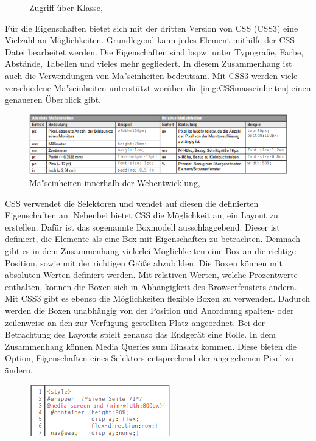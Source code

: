 \documentclass[a4paper,titlepage,halfparskip,12pt]{scrreprt}
\begin{document}
\begin{onehalfspacing}
\begin{figure}[h]
\begin{minipage}[c]{.4\textwidth}
		\caption{Zugriff über Klasse, \cite{buhler2017html5}}
		\label{img:CSSClass}
	\end{minipage}
\end{figure}
Für die Eigenschaften bietet sich mit der dritten Version von \ac{CSS} (\ac{CSS}3) eine Vielzahl an Möglichkeiten. Grundlegend kann jedes Element mithilfe der \ac{CSS}-Datei bearbeitet werden. Die Eigenschaften sind bspw. unter Typografie, Farbe, Abstände, Tabellen und vieles mehr gegliedert. In diesem Zusammenhang ist auch die Verwendungen von Ma"seinheiten bedeutsam. Mit \ac{CSS}3 werden viele verschiedene Ma"seinheiten unterstützt worüber die \autoref{img:CSSmasseinheiten} einen genaueren Überblick gibt.
\begin{figure}[h]
	\centering
	\includegraphics[scale=1.8]{images/CSSmasseinheiten}
	\caption{Ma"seinheiten innerhalb der Webentwicklung, \cite{buhler2017html5}} 
	\label{img:CSSmasseinheiten}
\end{figure}
\ac{CSS} verwendet die Selektoren und wendet auf diesen die definierten Eigenschaften an. Nebenbei bietet \ac{CSS} die Möglichkeit an, ein Layout zu erstellen. Dafür ist das sogenannte Boxmodell ausschlaggebend. Dieser ist definiert, die Elemente als eine Box mit Eigenschaften zu betrachten. Demnach gibt es in dem Zusammenhang vielerlei Möglichkeiten eine Box an die richtige Position, sowie mit der richtigen Größe abzubilden. Die Boxen können mit absoluten Werten definiert werden. Mit relativen Werten, welche Prozentwerte enthalten, können die Boxen sich in Abhängigkeit des Browserfensters ändern. Mit \ac{CSS}3 gibt es ebenso die Möglichkeiten flexible Boxen zu verwenden. Dadurch werden die Boxen unabhängig von der Position und Anordnung spalten- oder zeilenweise an den zur Verfügung gestellten Platz angeordnet. Bei der Betrachtung des Layouts spielt genauso das Endgerät eine Rolle. In dem Zusammenhang können Media Queries zum Einsatz kommen. Diese bieten die Option, Eigenschaften eines Selektors entsprechend der angegebenen Pixel zu ändern.
\begin{figure}[h]
	\centering
	\includegraphics[scale=2.8]{images/MediaQbsp}

\end{figure}
\end{onehalfspacing}
\end{document}
